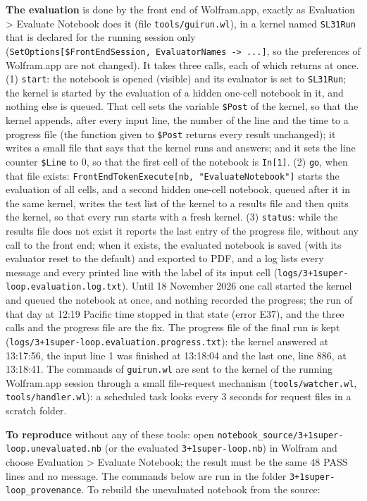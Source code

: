 \documentclass[
  10pt,
]{article}
\begin{document}
\textbf{The evaluation} is done by the front end of Wolfram.app, exactly
as Evaluation \textgreater{} Evaluate Notebook does it (file
\texttt{tools/guirun.wl}), in a kernel named \texttt{SL31Run} that is
declared for the running session only
(\texttt{SetOptions{[}\$FrontEndSession,\ EvaluatorNames\ -\textgreater{}\ ...{]}},
so the preferences of Wolfram.app are not changed). It takes three
calls, each of which returns at once. (1) \texttt{start}: the notebook
is opened (visible) and its evaluator is set to \texttt{SL31Run}; the
kernel is started by the evaluation of a hidden one-cell notebook in it,
and nothing else is queued. That cell sets the variable \texttt{\$Post}
of the kernel, so that the kernel appends, after every input line, the
number of the line and the time to a progress file (the function given
to \texttt{\$Post} returns every result unchanged); it writes a small
file that says that the kernel runs and answers; and it sets the line
counter \texttt{\$Line} to 0, so that the first cell of the notebook is
\texttt{In{[}1{]}}. (2) \texttt{go}, when that file exists:
\texttt{FrontEndTokenExecute{[}nb,\ "EvaluateNotebook"{]}} starts the
evaluation of all cells, and a second hidden one-cell notebook, queued
after it in the same kernel, writes the test list of the kernel to a
results file and then quits the kernel, so that every run starts with a
fresh kernel. (3) \texttt{status}: while the results file does not exist
it reports the last entry of the progress file, without any call to the
front end; when it exists, the evaluated notebook is saved (with its
evaluator reset to the default) and exported to PDF, and a log lists
every message and every printed line with the label of its input cell
(\texttt{logs/3+1super-loop.evaluation.log.txt}). Until 18 November 2026
one call started the kernel and queued the notebook at once, and nothing
recorded the progress; the run of that day at 12:19 Pacific time stopped
in that state (error E37), and the three calls and the progress file are
the fix. The progress file of the final run is kept
(\texttt{logs/3+1super-loop.evaluation.progress.txt}): the kernel
answered at 13:17:56, the input line 1 was finished at 13:18:04 and the
last one, line 886, at 13:18:41. The commands of \texttt{guirun.wl} are
sent to the kernel of the running Wolfram.app session through a small
file-request mechanism (\texttt{tools/watcher.wl},
\texttt{tools/handler.wl}): a scheduled task looks every 3 seconds for
request files in a scratch folder.

\textbf{To reproduce} without any of these tools: open
\texttt{notebook\_source/3+1super-loop.unevaluated.nb} (or the evaluated
\texttt{3+1super-loop.nb}) in Wolfram and choose Evaluation
\textgreater{} Evaluate Notebook; the result must be the same 48 PASS
lines and no message. The commands below are run in the folder
\texttt{3+1super-loop\_provenance}. To rebuild the unevaluated notebook
from the source:
\end{document}
